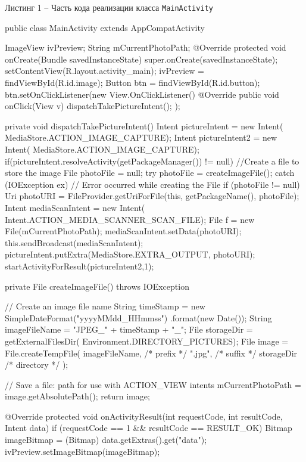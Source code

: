 \documentclass[a4paper,12pt]{article}
\begin{document}
\begin{center}
Листинг 1 -- Часть кода реализации класса \verb|MainActivity|
\end{center}


\begin{MyCode}

public class MainActivity extends AppCompatActivity {	
  ImageView ivPreview;
  String mCurrentPhotoPath;
  @Override
  protected void onCreate(Bundle savedInstanceState) {
      super.onCreate(savedInstanceState);
      setContentView(R.layout.activity_main);
      ivPreview = findViewById(R.id.image);
      Button btn = findViewById(R.id.button);
      btn.setOnClickListener(new View.OnClickListener() {
        @Override
        public void onClick(View v) {
          dispatchTakePictureIntent();
        }
      });
	}

  private void dispatchTakePictureIntent() {
    Intent pictureIntent = new Intent(
    MediaStore.ACTION_IMAGE_CAPTURE);
    Intent pictureIntent2 = new Intent(
      MediaStore.ACTION_IMAGE_CAPTURE);
    if(pictureIntent.resolveActivity(getPackageManager()) != null){
      //Create a file to store the image
      File photoFile = null;
      try {
        photoFile = createImageFile();
      } catch (IOException ex) {
        // Error occurred while creating the File		
      }
      if (photoFile != null) {
        Uri photoURI = FileProvider.getUriForFile(this, 
            getPackageName(), photoFile);
        Intent mediaScanIntent = new Intent(
            Intent.ACTION_MEDIA_SCANNER_SCAN_FILE);
        File f = new File(mCurrentPhotoPath);
        mediaScanIntent.setData(photoURI);
        this.sendBroadcast(mediaScanIntent);
        pictureIntent.putExtra(MediaStore.EXTRA_OUTPUT,
          photoURI);
        startActivityForResult(pictureIntent2,1);
      }
    }
  }

  private File createImageFile() throws IOException {
    // Create an image file name
    String timeStamp = new SimpleDateFormat("yyyyMMdd_HHmmss")
        .format(new Date());
    String imageFileName = "JPEG_" + timeStamp + "_";
    File storageDir = getExternalFilesDir(
        Environment.DIRECTORY_PICTURES);
    File image = File.createTempFile(
      imageFileName,  /* prefix */
      ".jpg",         /* suffix */
      storageDir      /* directory */
    );

    // Save a file: path for use with ACTION_VIEW intents
    mCurrentPhotoPath = image.getAbsolutePath();
    return image;
  }

  @Override
  protected void onActivityResult(int requestCode, int resultCode,
      Intent data) {
    if (requestCode == 1 && resultCode == RESULT_OK) {
      Bitmap imageBitmap = (Bitmap) data.getExtras().get("data");
      ivPreview.setImageBitmap(imageBitmap);
    }
  }
}
\end{MyCode}
\end{document}
